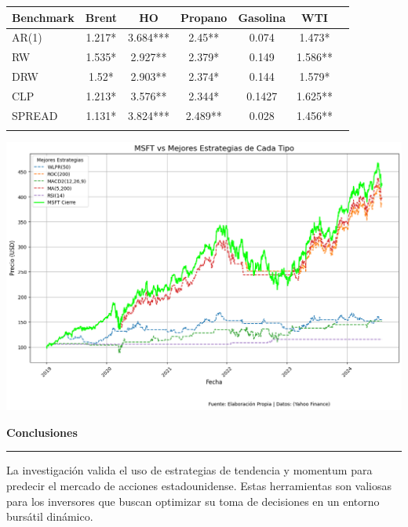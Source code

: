 \documentclass[a0,portrait]{a0poster}
\newcommand{\customsection}[1]{
    \begin{center}
        \vspace{1cm} %
        \color{black}
        \textbf{\Huge #1}
        \color{miRojo}
        \vspace{.5cm} %
        \hrule height 2.5pt  %
        \vspace{.5cm} %
    \end{center}
}
\begin{document}
\begin{multicols}{2}
    \vspace{1cm}
    \begin{minipage}{.984\linewidth}
    \centering
    \begin{tabular}{lcccccc}
        \toprule
        \textbf{Benchmark} & \textbf{Brent} & \textbf{HO} & \textbf{Propano} & \textbf{Gasolina} & \textbf{WTI} \\
        \midrule
        AR(1)     & 1.217*  & 3.684*** & 2.45** & 0.074  & 1.473*  \\
        RW        & 1.535*  & 2.927**  & 2.379* & 0.149  & 1.586** \\
        DRW       & 1.52*   & 2.903**  & 2.374* & 0.144  & 1.579*  \\
        CLP       & 1.213*  & 3.576**  & 2.344* & 0.1427 & 1.625** \\
        SPREAD    & 1.131*  & 3.824*** & 2.489** & 0.028  & 1.456** \\
        \bottomrule
        \vspace{.5cm}
    \end{tabular}
    \end{minipage}
    \begin{minipage}{\linewidth}
    \centering
    \includegraphics[width=0.9\linewidth]{grafico_mejores_estrategias_MSFT.png}
    \end{minipage}
    \customsection{Conclusiones}
    \par
    \indent La investigación valida el uso de estrategias de tendencia y momentum para predecir el mercado de acciones estadounidense. Estas herramientas son valiosas para los inversores que buscan optimizar su toma de decisiones en un entorno bursátil dinámico. 

\end{multicols}
\end{document}
